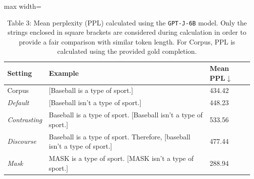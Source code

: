 \documentclass[varwidth=598pt]{standalone}
\begin{document}
\begin{table}
\centering
\begin{adjustbox}{max width=\textwidth}
    \begin{tabular}{p{1.25cm} p{4cm} p{0.75cm}}
    \toprule    
    Setting & Example & Mean PPL$\downarrow$  \\
    \midrule
        Corpus & [Baseball is a type of sport.] &  434.42 \\
        \midrule
        \textit{Default} & [Baseball isn't a type of sport.] & 448.23 \\
        \textit{Contrasting} & Baseball is a type of sport. [Baseball isn't a type of sport.] & 533.56 \\
        \textit{Discourse} & Baseball is a type of sport. Therefore, [baseball isn't a type of sport.]  & 477.44  \\
        \textit{Mask} & MASK is a type of sport. [MASK isn't a type of sport.] & 288.94  \\
    \bottomrule
    \end{tabular}
\end{adjustbox}
\caption{Table 3: Mean perplexity (PPL) calculated using the \texttt{GPT-J-6B} model. Only the strings enclosed in square brackets are considered during calculation in order to provide a fair comparison with similar token length. For Corpus, PPL is calculated using the provided gold completion.}
\end{table}
\end{document}
